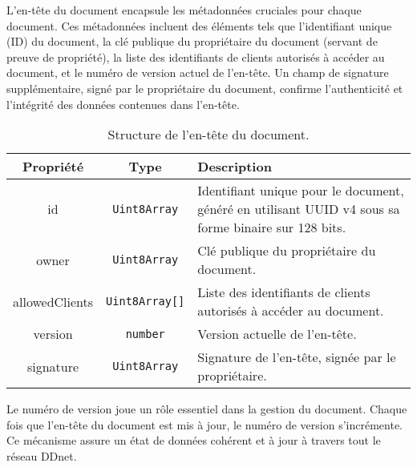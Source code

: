 L'en-tête du document encapsule les métadonnées cruciales pour chaque document.
Ces métadonnées incluent des éléments tels que l'identifiant unique (ID) du document, la clé publique du propriétaire du document (servant de preuve de propriété), la liste des identifiants de clients autorisés à accéder au document, et le numéro de version actuel de l'en-tête. Un champ de signature supplémentaire, signé par le propriétaire du document, confirme l'authenticité et l'intégrité des données contenues dans l'en-tête.

\setlength{\extrarowheight}{2pt} %

\begin{table}[h]
  \begin{center}
    \caption{Structure de l'en-tête du document.}
    \begin{tabularx}{\textwidth}{|c|c|X|}
      \hline
      \rowcolor{gray!20}
      \textbf{Propriété} & \textbf{Type}         & \textbf{Description}                                                                                 \\
      \hline
      id                 & \texttt{Uint8Array}   & Identifiant unique pour le document, généré en utilisant UUID v4 sous sa forme binaire sur 128 bits. \\
      \hline
      owner              & \texttt{Uint8Array}   & Clé publique du propriétaire du document.                                                            \\
      \hline
      allowedClients     & \texttt{Uint8Array[]} & Liste des identifiants de clients autorisés à accéder au document.                                   \\
      \hline
      version            & \texttt{number}       & Version actuelle de l'en-tête.                                                                       \\
      \hline
      signature          & \texttt{Uint8Array}   & Signature de l'en-tête, signée par le propriétaire.                                                  \\
      \hline
    \end{tabularx}
  \end{center}
\end{table}



Le numéro de version joue un rôle essentiel dans la gestion du document. Chaque fois que l'en-tête du document est mis à jour, le numéro de version s'incrémente. Ce mécanisme assure un état de données cohérent et à jour à travers tout le réseau DDnet.

